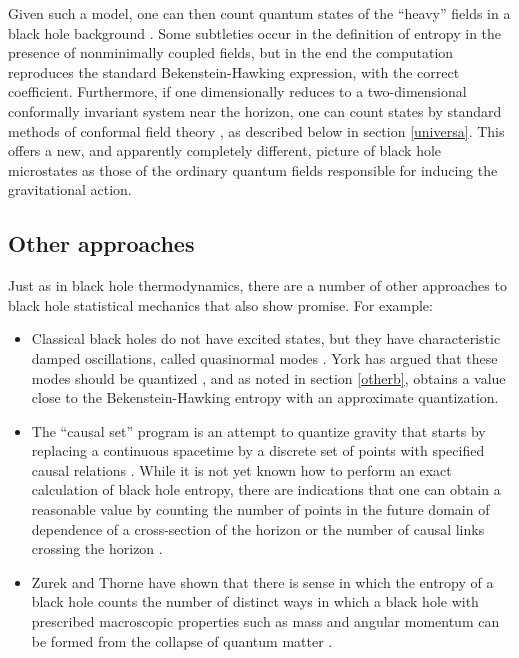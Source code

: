 \documentclass[12pt]{article}
\begin{document}
Given such a model, one can then count quantum states of the 
``heavy'' fields in a black hole background \cite{Frolovx,Frolovb}.
Some subtleties occur in the definition of entropy in the
presence of nonminimally coupled fields, but in the end the 
computation reproduces the standard Bekenstein-Hawking 
expression, with the correct coefficient.  Furthermore, 
if one dimensionally reduces to a two-dimensional conformally 
invariant system near the horizon,  
one can count states by standard methods of conformal field
theory \cite{Frolovc}, as described below in section \ref{universa}.  
This offers a new, and apparently completely different, picture 
of black hole microstates as those of the ordinary quantum fields 
responsible for inducing the gravitational action.

\subsection{Other approaches}

Just as in black hole thermodynamics, there are a number of
other approaches to black hole statistical mechanics that also
show promise.  For example:

\begin{itemize}
\item Classical black holes do not have excited states, but they
have characteristic damped oscillations, called quasinormal 
modes \cite{Siopsis}.  York has argued that these modes should be 
quantized \cite{York}, and as noted in section \ref{otherb}, obtains a 
value close to the Bekenstein-Hawking entropy with an approximate
quantization.

\item The ``causal set'' program is an attempt to quantize gravity
that starts by replacing a continuous spacetime by a discrete set
of points with specified causal relations \cite{Sorkin_caus}.  While
it is not yet known how to perform an exact calculation of black
hole entropy, there
are indications that one can obtain a reasonable value by counting
the number of points in the future domain of dependence of a
cross-section of the horizon \cite{Rideout} or the number of
causal links crossing the horizon \cite{Dou}.

\item Zurek and Thorne have shown that there is sense in which 
the entropy of a black hole counts the number of distinct ways
in which a black hole with prescribed macroscopic properties
such as mass and angular momentum can be formed from the
collapse of quantum matter \cite{Zurek}.
\end{itemize}
\end{document}
